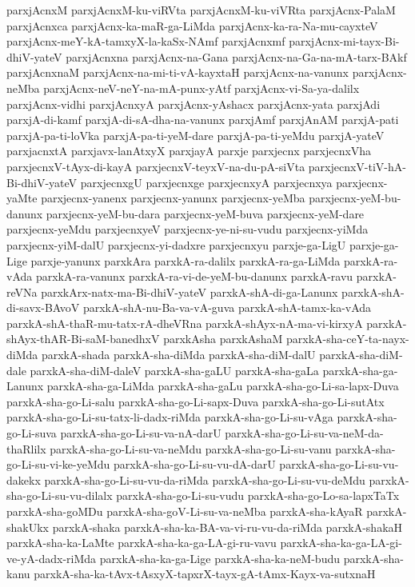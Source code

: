 {parxjAcnxM
parxjAcnxM-ku-viRVta
parxjAcnxM-ku-viVRta
parxjAcnx-PalaM
parxjAcnxca
parxjAcnx-ka-maR-ga-LiMda
parxjAcnx-ka-ra-Na-mu-cayxteV
parxjAcnx-meY-kA-tamxyX-la-kaSx-NAmf
parxjAcnxmf
parxjAcnx-mi-tayx-Bi-dhiV-yateV
parxjAcnxna
parxjAcnx-na-Gana
parxjAcnx-na-Ga-na-mA-tarx-BAkf
parxjAcnxnaM
parxjAcnx-na-mi-ti-vA-kayxtaH
parxjAcnx-na-vanunx
parxjAcnx-neMba
parxjAcnx-neV-neY-na-mA-punx-yAtf
parxjAcnx-vi-Sa-ya-dalilx
parxjAcnx-vidhi
parxjAcnxyA
parxjAcnx-yAshacx
parxjAcnx-yata
parxjAdi
parxjA-di-kamf
parxjA-di-sA-dha-na-vanunx
parxjAmf
parxjAnAM
parxjA-pati
parxjA-pa-ti-loVka
parxjA-pa-ti-yeM-dare
parxjA-pa-ti-yeMdu
parxjA-yateV
parxjacnxtA
parxjavx-lanAtxyX
parxjayA
parxje
parxjecnx
parxjecnxVha
parxjecnxV-tAyx-di-kayA
parxjecnxV-teyxV-na-du-pA-siVta
parxjecnxV-tiV-hA-Bi-dhiV-yateV
parxjecnxgU
parxjecnxge
parxjecnxyA
parxjecnxya
parxjecnx-yaMte
parxjecnx-yanenx
parxjecnx-yanunx
parxjecnx-yeMba
parxjecnx-yeM-bu-danunx
parxjecnx-yeM-bu-dara
parxjecnx-yeM-buva
parxjecnx-yeM-dare
parxjecnx-yeMdu
parxjecnxyeV
parxjecnx-ye-ni-su-vudu
parxjecnx-yiMda
parxjecnx-yiM-dalU
parxjecnx-yi-dadxre
parxjecnxyu
parxje-ga-LigU
parxje-ga-Lige
parxje-yanunx
parxkAra
parxkA-ra-dalilx
parxkA-ra-ga-LiMda
parxkA-ra-vAda
parxkA-ra-vanunx
parxkA-ra-vi-de-yeM-bu-danunx
parxkA-ravu
parxkA-reVNa
parxkArx-natx-ma-Bi-dhiV-yateV
parxkA-shA-di-ga-Lanunx
parxkA-shA-di-savx-BAvoV
parxkA-shA-nu-Ba-va-vA-guva
parxkA-shA-tamx-ka-vAda
parxkA-shA-thaR-mu-tatx-rA-dheVRna
parxkA-shAyx-nA-ma-vi-kirxyA
parxkA-shAyx-thAR-Bi-saM-banedhxV
parxkAsha
parxkAshaM
parxkA-sha-ceY-ta-nayx-diMda
parxkA-shada
parxkA-sha-diMda
parxkA-sha-diM-dalU
parxkA-sha-diM-dale
parxkA-sha-diM-daleV
parxkA-sha-gaLU
parxkA-sha-gaLa
parxkA-sha-ga-Lanunx
parxkA-sha-ga-LiMda
parxkA-sha-gaLu
parxkA-sha-go-Li-sa-lapx-Duva
parxkA-sha-go-Li-salu
parxkA-sha-go-Li-sapx-Duva
parxkA-sha-go-Li-sutAtx
parxkA-sha-go-Li-su-tatx-li-dadx-riMda
parxkA-sha-go-Li-su-vAga
parxkA-sha-go-Li-suva
parxkA-sha-go-Li-su-va-nA-darU
parxkA-sha-go-Li-su-va-neM-da-thaRlilx
parxkA-sha-go-Li-su-va-neMdu
parxkA-sha-go-Li-su-vanu
parxkA-sha-go-Li-su-vi-ke-yeMdu
parxkA-sha-go-Li-su-vu-dA-darU
parxkA-sha-go-Li-su-vu-dakekx
parxkA-sha-go-Li-su-vu-da-riMda
parxkA-sha-go-Li-su-vu-deMdu
parxkA-sha-go-Li-su-vu-dilalx
parxkA-sha-go-Li-su-vudu
parxkA-sha-go-Lo-sa-lapxTaTx
parxkA-sha-goMDu
parxkA-sha-goV-Li-su-va-neMba
parxkA-sha-kAyaR
parxkA-shakUkx
parxkA-shaka
parxkA-sha-ka-BA-va-vi-ru-vu-da-riMda
parxkA-shakaH
parxkA-sha-ka-LaMte
parxkA-sha-ka-ga-LA-gi-ru-vavu
parxkA-sha-ka-ga-LA-gi-ve-yA-dadx-riMda
parxkA-sha-ka-ga-Lige
parxkA-sha-ka-neM-budu
parxkA-sha-kanu
parxkA-sha-ka-tAvx-tAsxyX-tapxrX-tayx-gA-tAmx-Kayx-va-sutxnaH
}

